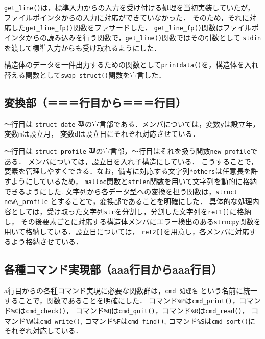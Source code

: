 \documentclass[a4j,11pt]{jarticle}
\begin{document}
\verb|get_line()|は，標準入力からの入力を受け付ける処理を当初実装していたが，ファイルポインタからの入力に対応ができていなかった．
そのため，それに対応した\verb|get_line_fp()|関数をファサードした．
\verb|get_line_fp()|関数はファイルポインタからの読み込みを行う関数で，\verb|get_line()|関数ではその引数として
\verb|stdin|を渡して標準入力からも受け取れるようにした．

構造体のデータを一件出力するための関数として\verb|printdata()|を，構造体を入れ替える関数として\verb|swap_struct()|関数を宣言した．
\subsection{変換部（＝＝＝行目から＝＝＝行目）}

〜行目は \verb|struct date| 型の宣言部である．メンバについては，変数\verb|y|は設立年，変数\verb|m|は設立月，
変数\verb|d|は設立日にそれぞれ対応させている．

〜行目は \verb|struct profile| 型の宣言部，〜行目はそれを扱う関数\verb|new_profile|である．
メンバについては，設立日を入れ子構造にしている．
こうすることで，要素を管理しやすくできる．なお，備考に対応する文字列\verb|*others|は任意長を許すようにしているため，
\verb|malloc|関数と\verb|strlen|関数を用いて文字列を動的に格納できるようにした. 
文字列から各データ型への変換を担う関数は，\verb|struct new\_profile| とすることで，変換部であることを明確にした．
具体的な処理内容としては，受け取った文字列\verb|str|を分割し，分割した文字列を\verb|ret1[]|に格納し，
その後要素ごとに対応する構造体メンバにエラー検出のある\verb|strncpy|関数を用いて格納している．設立日については，
\verb|ret2[]|を用意し，各メンバに対応するよう格納させている．

\subsection{各種コマンド実現部（aaa行目からaaa行目）}
a行目からの各種コマンド実現に必要な関数群は，\verb|cmd_処理名| という名前に統一することで，関数であることを明確にした．
コマンド\verb|%P|は\verb|cmd_print()|，コマンド\verb|%C|は\verb|cmd_check()|，
コマンド\verb|%Q|は\verb|cmd_quit()|，コマンド\verb|%R|は\verb|cmd_read()|，
コマンド\verb|%W|は\verb|cmd_write()|, コマンド\verb|%F|は\verb|cmd_find()|, 
コマンド\verb|%S|は\verb|cmd_sort()|にそれぞれ対応している．
\end{document}
